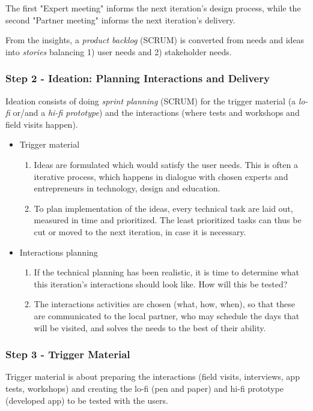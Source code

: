     The first "Expert meeting" informs the next iteration's design process, while the second "Partner meeting" informs the next iteration's delivery.

    From the insights, a \textit{product backlog} (SCRUM) is converted from needs and ideas into \textit{stories} balancing 1) user needs and 2) stakeholder needs.

\subsubsection{Step 2 - Ideation: Planning Interactions and Delivery}
  Ideation consists of doing \textit{sprint planning} (SCRUM) for the trigger material (a \textit{lo-fi} or/and a \textit{hi-fi prototype}) and the interactions (where tests and workshops and field visits happen).

    \begin{itemize}
    \item Trigger material
      \begin{enumerate}
      \item Ideas are formulated which would satisfy the user needs. This is often a iterative process, which happens in dialogue with chosen experts and entrepreneurs in technology, design and education.
      \item To plan implementation of the ideas, every technical task are laid out, measured in time and prioritized. The least prioritized tasks can thus be cut or moved to the next iteration, in case it is necessary.
      \end{enumerate}
    \item Interactions planning
      \begin{enumerate}
      \item If the technical planning has been realistic, it is time to determine what this iteration's interactions should look like. How will this be tested?
      \item The interactions activities are chosen (what, how, when), so that these are communicated to the local partner, who may schedule the days that will be visited, and solves the needs to the best of their ability.
      \end{enumerate}
    \end{itemize}

  \subsubsection{Step 3 - Trigger Material}
  Trigger material is about preparing the interactions (field visits, interviews, app tests, workshops) and creating the lo-fi (pen and paper) and hi-fi prototype (developed app) to be tested with the users.

